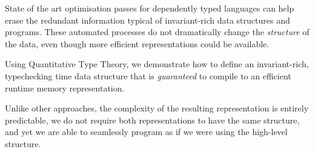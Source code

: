   State of the art optimisation passes for dependently typed languages can help
  erase the redundant information typical of invariant-rich data structures and
  programs.
  These automated processes do not dramatically change the \emph{structure} of
  the data, even though more efficient representations could be available.

  Using Quantitative Type Theory, we demonstrate how to define an invariant-rich,
  typechecking time data structure that is \emph{guaranteed} to compile to an
  efficient runtime memory representation.

  Unlike other approaches, the complexity of the resulting representation is
  entirely predictable, we do not require both representations to have the
  same structure, and yet we are able to seamlessly program as if we were
  using the high-level structure.
